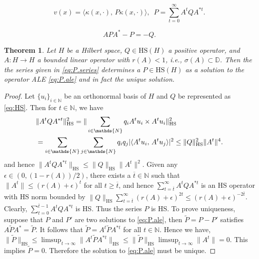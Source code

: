 \documentclass[10pt,a4paper]{amsart}
\newtheorem{theorem}{Theorem}
\newcommand{\ip}[2]{\langle #1, \, #2 \rangle}
\newcommand{\mD}{\mbb{D}}
\newcommand{\mN}{\mbb{N}}
\newcommand{\mbb}[1]{\mathds{#1}} %
\newcommand{\mr}[1]{\mathrm{#1}}
\begin{document}
\begin{equation}\label{eq:P.series}
    \textstyle 
    v(x) = \ip{\kappa(x, \cdot)}{P\kappa(x, \cdot)}, \enspace 
    P = \sum_{t=0}^\infty A^t Q A^{*t}.
\end{equation}

\begin{equation}\label{eq:P.ale}
    APA^\ast - P = -Q. 
\end{equation}

\begin{theorem}
    Let $H$ be a Hilbert space, $Q\in \mr{HS}(H)$ a positive operator, and $A: H\rightarrow H$ a bounded linear operator with $r(A)<1$, i.e., $\sigma(A)\subset \mD$. Then the the series given in \eqref{eq:P.series} determines a $P\in \mr{HS}(H)$ as a solution to the operator ALE \eqref{eq:P.ale} and in fact the unique solution.  
\end{theorem}

\begin{proof}
    Let $\{u_i\}_{i\in \mN}$ be an orthonormal basis of $H$ and $Q$ be represented as \eqref{eq:HS}. Then for $t\in \mN$, we have
    \begin{align*} 
    \textstyle 
        &\|A^tQA^{\ast t}\|_{\mr{HS}}^2 = \|\sum_{i\in \mN} q_i A^tu_i\times A^tu_i \|_{\mr{HS}}^2 \\
        &= \sum_{i\in \mN}\sum_{j\in \mN} q_iq_j|\ip{A^tu_i}{A^tu_j}|^2 \leq \|Q\|_{\mr{HS}}^2\|A^t\|^4. 
    \end{align*}
    and hence $\|A^tQA^{\ast t}\|_{\mr{HS}} \leq \|Q\|_{\mr{HS}}\|A^t\|^2$. Given any $\epsilon \in (0, (1-r(A))/2)$, there exists a $\overline{t}\in \mN$ such that $\|A^t\|\leq (r(A)+\epsilon)^t$ for all $t\geq \overline{t}$, and hence $\sum_{t=\overline{t}}^\infty A^tQA^{\ast t}$ is an HS operator with HS norm bounded by $\|Q\|_{\mr{HS}} \sum_{t=\overline{t}}^\infty (r(A)+\epsilon)^{2t} \leq (r(A)+\epsilon)^{-2\overline{t}}$. 
    Clearly, $\sum_{t=0}^{\overline{t}-1} A^tQA^{\ast t}$ is HS. Thus the series $P$ is HS. To prove uniqueness, suppose that $P$ and $P'$ are two solutions to \eqref{eq:P.ale}, then $\tilde{P} = P-P'$ satisfies $A\tilde{P}A^\ast = \tilde{P}$. It follows that $\tilde{P} = A^t\tilde{P}A^{\ast t}$ for all $t\in \mN$. Hence we have, 
    $\|\tilde{P}\|_{\mr{HS}} \leq \limsup_{t\rightarrow \infty} \|A^t\tilde{P}A^{\ast t}\|_{\mr{HS}} \leq \|\tilde{P}\|_{\mr{HS}}\limsup_{t\rightarrow \infty} \|A^t\| = 0.$ This implies $\tilde{P}=0$. Therefore the solution to \eqref{eq:P.ale} must be unique. 
\end{proof}
\end{document}
